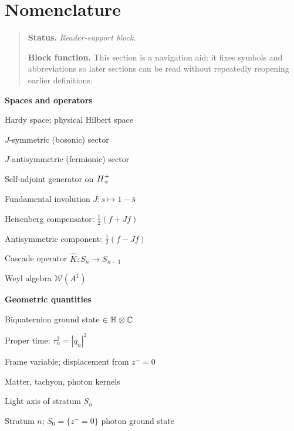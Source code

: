 \section*{Nomenclature}
\begin{quote}\small
\noindent\textbf{Status.} \emph{Reader-support block.}\par
\noindent\textbf{Block function.} This section is a navigation aid: it fixes symbols and abbreviations so later sections can be read without repeatedly reopening earlier definitions.
\end{quote}

\noindent\begin{minipage}[t]{0.48\textwidth}
\small
\noindent\textbf{Spaces and operators}
\begin{description}[leftmargin=1.8em, labelindent=0pt, itemsep=1pt]
  \item[$\Hplus$] Hardy space; physical Hilbert space
  \item[$\Hplusplus$] $J$-symmetric (bosonic) sector
  \item[$\Hplusminus$] $J$-antisymmetric (fermionic) sector
  \item[$L_0$] Self-adjoint generator on $\Hplusplus$
  \item[$J$] Fundamental involution $J:s\mapsto 1-\bar s$
  \item[$C(f)$] Heisenberg compensator: $\tfrac{1}{2}(f+Jf)$
  \item[$A(f)$] Antisymmetric component: $\tfrac{1}{2}(f-Jf)$
  \item[$\KC$] Cascade operator $\hat K:S_n\to S_{n-1}$
  \item[$\WA$] Weyl algebra $\mathcal{W}(A^1)$
\end{description}

\medskip
\noindent\textbf{Geometric quantities}
\begin{description}[leftmargin=1.8em, labelindent=0pt, itemsep=1pt]
  \item[$q_n$] Biquaternion ground state $\in\mathbb{H}\otimes\mathbb{C}$
  \item[$\tau_n$] Proper time: $\tau_n^2=|q_n|^2$
  \item[$\zminus$] Frame variable; displacement from $z^-=0$
  \item[$K_1,K_2,K_3$] Matter, tachyon, photon kernels
  \item[$L_n$] Light axis of stratum $S_n$
  \item[$S_n$] Stratum $n$; $S_0=\{z^-=0\}$ photon ground state
\end{description}


\end{minipage}
